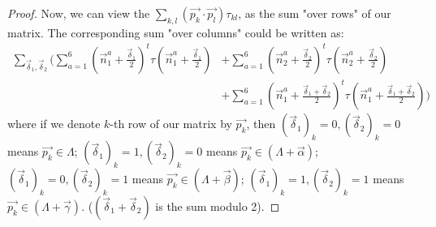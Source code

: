 \documentclass{article}
\newcommand{\de}{\delta}
\theoremstyle{plain}
\theoremstyle{definition}
\begin{document}
\begin{proof}
        Now, we can view the $\sum_{k, l} ({\vec{p_k}} \cdot {\vec{p_l}}) \tau_{kl}$,
        as the sum "over rows" of our matrix. 
        The corresponding sum "over columns" could be written as:
        \begin{align}
            \sum_{{\vec{\de}}_1, {\vec{\de}}_2} \Big(
                \sum_{a=1}^6 (\vec{n}_1^a + \frac{{\vec{\de}}_1}{2})^t \tau (\vec{n}_1^a + \frac{{\vec{\de}}_1}{2})
                &+ \sum_{a=1}^6 (\vec{n}_2^a + \frac{{\vec{\de}}_2}{2})^t \tau (\vec{n}_2^a + \frac{{\vec{\de}}_2}{2}) \nonumber \\
                &+ \sum_{a=1}^6 (\vec{n}_1^a + \frac{{\vec{\de}}_1 + {\vec{\de}}_2}{2})^t \tau 
                    (\vec{n}_1^a + \frac{{\vec{\de}}_1 + {\vec{\de}}_2}{2})
            \Big)
        \end{align}
        where if we denote $k$-th row of our matrix by ${\vec{p_k}}$, then
        $({\vec{\de}}_1)_k=0, ({\vec{\de}}_2)_k=0$ means ${\vec{p_k}} \in \Lambda$;
        $({\vec{\de}}_1)_k=1, ({\vec{\de}}_2)_k=0$ means ${\vec{p_k}} \in (\Lambda + \vec{\alpha})$;
        $({\vec{\de}}_1)_k=0, ({\vec{\de}}_2)_k=1$ means ${\vec{p_k}} \in (\Lambda + \vec{\beta})$; 
        $({\vec{\de}}_1)_k=1, ({\vec{\de}}_2)_k=1$ means ${\vec{p_k}} \in (\Lambda + \vec{\gamma})$. \Big($({\vec{\de}}_1 + {\vec{\de}}_2)$ is the sum modulo 2\Big).
    \end{proof}
\end{document}
